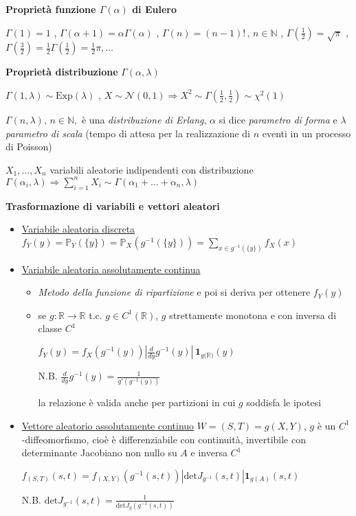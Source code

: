 \documentclass[openany]{book} %
\begin{document}
\textbf{Proprietà funzione $\Gamma(\alpha)$ di Eulero} 

$\Gamma(1)=1$ , \quad 
$\Gamma(\alpha+1) = \alpha\Gamma(\alpha)$ , \quad
$\Gamma(n)=(n-1)!\,,\,n\in \mathbb{N}$ , \quad 
$\Gamma(\frac{1}{2})=\sqrt {\pi}$ , \quad 
$\Gamma(\frac{3}{2})=\frac{1}{2}\Gamma(\frac{1}{2})=\frac{1}{2}\pi,\dots$

\textbf{Proprietà distribuzione} $\Gamma(\alpha,\lambda)$

$\Gamma(1,\lambda) \sim \text{Exp}(\lambda)$ , \quad $X\sim \mathcal {N}(0,1)\Rightarrow X^2\sim\Gamma(\frac{1}{2},\frac{1}{2})\sim\chi^2(1)$ 

$\Gamma(n,\lambda),\,n\in \mathbb{N},$ è una \textit{distribuzione di Erlang}, $\alpha$ si dice \textit{parametro di forma} e $\lambda$ \textit{parametro di scala} (tempo di attesa per la realizzazione di $n$ eventi in un processo di Poisson)

$X_1,\dots,X_n$ variabili aleatorie indipendenti con distribuzione $\Gamma(\alpha_i,\lambda)\Rightarrow \sum_{i=1}^nX_i\sim\Gamma(\alpha_1+\dots+\alpha_n,\lambda)$

\textbf{Trasformazione di variabili e vettori aleatori}

\begin{itemize}

\item \underline{Variabile aleatoria discreta} $f_Y(y)=\mathbb{P}_Y(\{y\})=\mathbb{P}_X(g^{-1}(\{y\}))=\sum_{x\in g^{-1}(\{y\})}f_X(x)$
 
\item \underline{Variabile aleatoria assolutamente continua} 

\begin{itemize}

\item \textit{Metodo della funzione di ripartizione} e poi si deriva per ottenere $f_Y(y)$

\item se $g:\mathbb{R}\rightarrow \mathbb{R}$ t.c. $g\in C^1(\mathbb{R})$, $g$ strettamente monotona e con inversa di classe $C^1$

$f_Y(y)=f_X(g^{-1}(y))|\frac{d}{dy}g^{-1}(y)|\,\boldsymbol{1}_{g(\mathbb{R)}}(y)$

N.B. $\frac{d}{dy}g^{-1}(y) = \frac{1}{g'(g^{-1}(y))}$

la relazione è valida anche per partizioni in cui $g$ soddisfa le ipotesi

\end{itemize}

\item \underline{Vettore aleatorio assolutamente continuo} $W = (S,T) = g(X,Y)$, $g$ è un $C^1$-diffeomorfismo, cioè è differenziabile con continuità, invertibile con determinante Jacobiano non nullo su $A$ e inversa $C^1$

$f_{(S,T)}(s,t)=f_{(X,Y)}(g^{-1}(s,t))\left|\text{det} J_{g^{-1}}(s,t)\right|\boldsymbol{1}_{g(A)}(s,t)$

N.B. $\text{det}J_{g^{-1}}(s,t)=\frac{1}{\text{det}J_g(g^{-1}(s,t))}$

\end{itemize}
\end{document}
